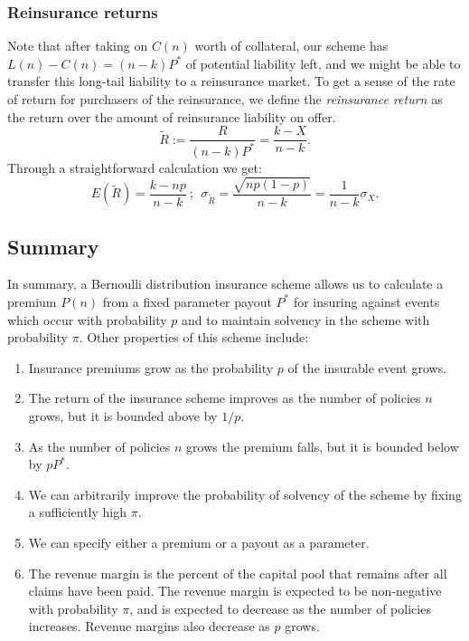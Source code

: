 \documentclass[12pt]{article}
\begin{document}
\subsubsection{Reinsurance returns}

Note that after taking on $C(n)$ worth of collateral, our scheme has $L(n)-C(n) =(n-k)P^*$ of potential liability left, and we might be able to transfer this long-tail liability to a reinsurance market. To get a sense of the rate of return for purchasers of the reinsurance, we define the \textit{reinsurance return} as the return over the amount of reinsurance liability on offer.
\begin{equation}
  \tilde{R} := \frac{R}{(n-k)P^*} = \frac{k-X}{n-k}.
\end{equation}
Through a straightforward calculation we get:
$$E(\tilde{R}) = \frac{k - np}{n-k}\ ;\ \ \sigma_{\tilde{R}} = \frac{\sqrt{np(1-p)}}{n-k} = \frac{1}{n-k}\sigma_X.$$

\subsection{Summary}

In summary, a Bernoulli distribution insurance scheme allows us to calculate a premium $P(n)$ from a fixed parameter payout $P^*$ for insuring against events which occur with probability $p$ and to maintain solvency in the scheme with probability $\pi$. Other properties of this scheme include:

\begin{enumerate}
    \item Insurance premiums grow as the probability $p$ of the insurable event grows.
    \item The return of the insurance scheme improves as the number of policies $n$ grows, but it is bounded above by $1/p$.
    \item As the number of policies $n$ grows the premium falls, but it is bounded below by $pP^*$.
    \item We can arbitrarily improve the probability of solvency of the scheme by fixing a sufficiently high $\pi$.
    \item We can specify either a premium or a payout as a parameter.
    \item The revenue margin is the percent of the capital pool that remains after all claims have been paid. The revenue margin is expected to be non-negative with probability $\pi$, and is expected to decrease as the number of policies increases. Revenue margins also decrease as $p$ grows.
\end{enumerate}
\end{document}
